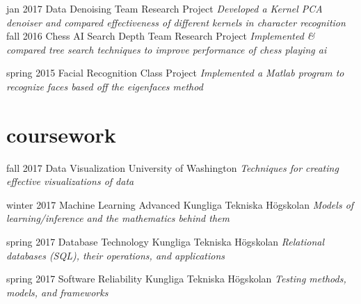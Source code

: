 \documentclass[]{friggeri-cv}
\begin{document}
\begin{entrylist}
  \entry
    {jan 2017}
    {Data Denoising}
    {Team Research Project}
    {\emph{Developed a Kernel PCA denoiser and compared effectiveness of different kernels in character recognition}}
  \entry
    {fall 2016}
    {Chess AI Search Depth}
    {Team Research Project}
    {\emph{Implemented \& compared tree search techniques to improve performance of chess playing ai}}

  \entry
    {spring 2015}
    {Facial Recognition}
    {Class Project}
    {\emph{Implemented a Matlab program to recognize faces based off the eigenfaces method}}
\end{entrylist}

\section{coursework}

\begin{entrylist}
  \entry
    {fall 2017}
    {Data Visualization}
    {University of Washington}
    {\emph{Techniques for creating effective visualizations of data}}

  \entry
    {winter 2017}
    {Machine Learning Advanced}
    {Kungliga Tekniska Högskolan}
    {\emph{Models of learning/inference and the mathematics behind them}}


  \entry
    {spring 2017}
    {Database Technology}
    {Kungliga Tekniska Högskolan}
    {\emph{Relational databases (SQL), their operations, and applications}}

  \entry
    {spring 2017}
    {Software Reliability}
    {Kungliga Tekniska Högskolan}
    {\emph{Testing methods, models, and frameworks}}



\end{entrylist}
\end{document}
